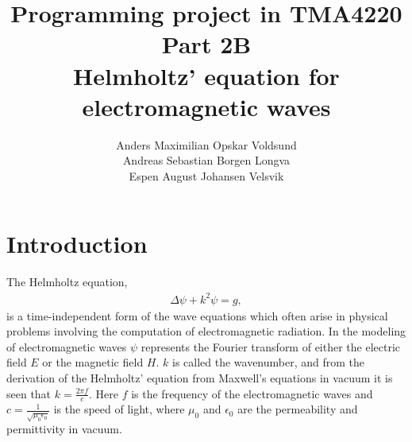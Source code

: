 \documentclass[10pt,a4paper]{article}
\begin{document}
\title{Programming project in TMA4220 \\ Part 2B \\ Helmholtz' equation for electromagnetic waves}
\author{Anders Maximilian Opskar Voldsund \\ Andreas Sebastian Borgen Longva \\ Espen August Johansen Velsvik}
\maketitle


\section*{Introduction}
The Helmholtz equation,
\begin{equation}
\begin{aligned}
\label{Helmholtz}
\Delta \psi + k^2 \psi = g,
\end{aligned}
\end{equation}
is a time-independent form of the wave equations which often arise in physical problems involving the computation of electromagnetic radiation. In the modeling of electromagnetic waves $\psi$ represents the Fourier transform of either the electric field $E$ or the magnetic field $H$. $k$ is called the wavenumber, and from the derivation of the Helmholtz' equation from Maxwell's equations in vacuum it is seen that $k = \frac{2\pi f}{c}$. Here $f$ is the frequency of the electromagnetic waves and $c = \frac{1}{\sqrt{\mu_0 \epsilon_0}}$ is the speed of light, where $\mu_0$ and $\epsilon_0$ are the permeability and permittivity in vacuum.
\end{document}
